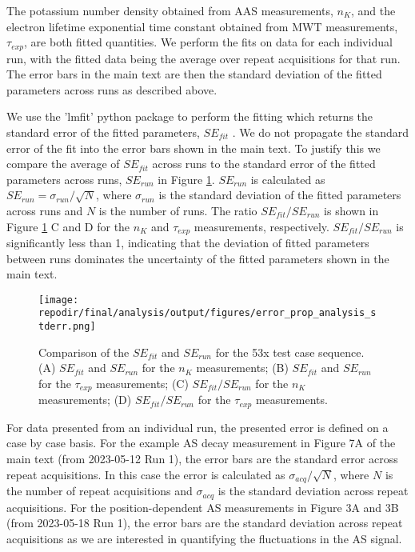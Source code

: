 The potassium number density obtained from AAS measurements, $n_{K}$, and the electron lifetime exponential time constant obtained from MWT measurements, $\tau_{exp}$, are both fitted quantities. We perform the fits on data for each individual run, with the fitted data being the average over repeat acquisitions for that run. The error bars in the main text are then the standard deviation of the fitted parameters across runs as described above.

We use the 'lmfit' python package to perform the fitting which returns the standard error  of the fitted parameters, $SE_{fit}$ . We do not propagate the standard error of the fit into the error bars shown in the main text. To justify this we compare the average of $SE_{fit}$ across runs to the standard error of the fitted parameters across runs, $SE_{run}$ in Figure \ref{fig:SI_error_prop_analysis}. $SE_{run}$ is calculated as $SE_{run} = \sigma_{run}/\sqrt{N}$, where $\sigma_{run}$ is the standard deviation of the fitted parameters across runs and $N$ is the number of runs. The ratio $SE_{fit}/SE_{run}$ is shown in Figure \ref{fig:SI_error_prop_analysis} C and D for the $n_K$ and $\tau_{exp}$ measurements, respectively. 
$SE_{fit}/SE_{run}$ is significantly less than 1, indicating that the deviation of fitted parameters between runs dominates the uncertainty of the fitted parameters shown in the main text.


\begin{figure}
    \centering
    \texttt{[image: \\repodir/final/analysis/output/figures/error\_prop\_analysis\_stderr.png]} 
    \caption{Comparison of the $SE_{fit}$ and $SE_{run}$ for the 53x test case sequence. (A) $SE_{fit}$ and $SE_{run}$ for the $n_{K}$ measurements; (B) $SE_{fit}$ and $SE_{run}$ for the $\tau_{exp}$ measurements; (C) $SE_{fit}/SE_{run}$ for the $n_{K}$ measurements; (D) $SE_{fit}/SE_{run}$ for the $\tau_{exp}$ measurements. }
    \label{fig:SI_error_prop_analysis}
\end{figure}


For data presented from an individual run, the presented error is defined on a case by case basis. For the example AS decay measurement in Figure 7A of the main text (from 2023-05-12 Run 1), the error bars are the standard error across repeat acquisitions. In this case the error is calculated as $\sigma_{acq}/\sqrt{N}$, where $N$ is the number of repeat acquisitions and $\sigma_{acq}$ is the standard deviation across repeat acquisitions.  For the position-dependent AS measurements in Figure 3A and 3B (from 2023-05-18 Run 1), the error bars are the standard deviation across repeat acquisitions as we are interested in quantifying the fluctuations in the AS signal. 
